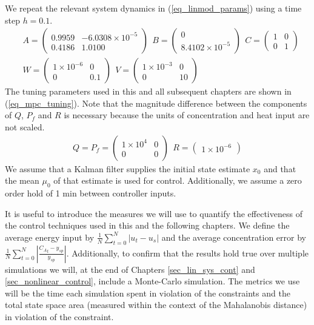 We repeat the relevant system dynamics in (\ref{eq_linmod_params}) using a time step $h=0.1$. 
\begin{equation}
\begin{aligned}
&A = \begin{pmatrix}
0.9959 & -6.0308\times 10^{-5} \\
0.4186 & 1.0100
\end{pmatrix}
~~B = \begin{pmatrix}
0 \\ 8.4102\times 10^{-5}
\end{pmatrix} ~~
C = \begin{pmatrix}
1 & 0 \\ 0 & 1
\end{pmatrix} \\
&W = \begin{pmatrix}
1\times 10^{-6} & 0 \\ 0 & 0.1
\end{pmatrix} ~~
V = \begin{pmatrix}
1\times 10^{-3} & 0 \\ 0 & 10
\end{pmatrix}
\end{aligned}
\label{eq_linmod_params}
\end{equation}
The tuning parameters used in this and all subsequent chapters are shown in (\ref{eq_mpc_tuning}). Note that the magnitude difference between the components of $Q$, $P_f$ and $R$ is necessary because the units of concentration and heat input are not scaled. 
\begin{equation}
\begin{aligned}
Q = P_f = \begin{pmatrix}
1\times 10^{4} & 0 \\ 0 & 0
\end{pmatrix} 
~~R = \begin{pmatrix}
1\times 10^{-6}
\end{pmatrix}
\end{aligned}
\label{eq_mpc_tuning}
\end{equation}
We assume that a Kalman filter supplies the initial state estimate $x_0$ and that the mean $\mu_0$ of that estimate is used for control. Additionally, we assume a zero order hold of 1 min between controller inputs.

It is useful to introduce the measures we will use to quantify the effectiveness of the control techniques used in this and the following chapters. We define the average energy input by $\frac{1}{N}\sum^N_{t=0}|u_t-u_s|$ and the average concentration error by $\frac{1}{N}\sum^N_{t=0}|\frac{{C_A}_t-y_{sp}}{y_{sp}}|$. Additionally, to confirm that the results hold true over multiple simulations we will, at the end of Chapters \ref{sec_lin_sys_cont} and \ref{sec_nonlinear_control}, include a Monte-Carlo simulation. The metrics we use will be the time each simulation spent in violation of the constraints and the total state space area (measured within the context of the Mahalanobis distance) in violation of the constraint. 

